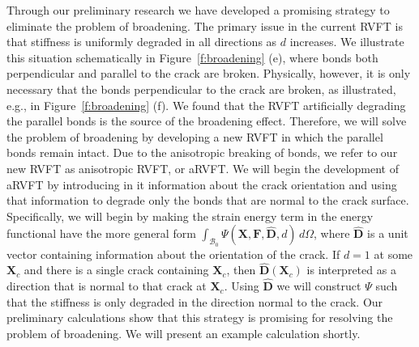\documentclass[10pt,letterpaper]{article}
\newcommand{\bs}[1]{\ensuremath{\boldsymbol{#1}}}
\begin{document}
    Through our preliminary research we have developed a promising strategy to eliminate the problem of broadening.
    The primary issue in the current RVFT is that stiffness is uniformly degraded in all directions as $d$ increases.
    We illustrate this situation schematically in Figure~\ref{f:broadening} (e), where bonds both perpendicular and parallel to the crack are broken.
    Physically, however,  it is only necessary that the bonds perpendicular to the crack are broken, as illustrated, e.g., in  Figure~\ref{f:broadening} (f).
    We found that the RVFT artificially degrading the parallel bonds is the source of the broadening effect.
    Therefore, we will solve the problem of broadening by developing a new RVFT in which the parallel bonds remain intact.
    Due to the anisotropic breaking of bonds, we refer to our new RVFT as anisotropic RVFT, or aRVFT.
    We will begin the development of aRVFT by introducing in it information about the crack orientation and using that information to degrade only the bonds that are normal to the crack surface.
    Specifically, we will begin by making the strain energy term in the energy functional have the more general form $\int_{\mathcal{B}_0}\mathsf{\Psi}(\bs{X}, \bs{F},\hat{\bs{D}},d)\, d\Omega$, where $\hat{\bs{D}}$ is a unit vector containing information about the orientation of the crack.
    If $d=1$ at some $\bs{X}_c$ and there is a single crack containing $\bs{X}_c$, then $\hat{\bs{D}}(\bs{X}_c)$ is interpreted as a direction that is normal to that crack at $\bs{X}_c$.
    Using $\hat{\bs{D}}$ we will construct $\mathsf{\Psi}$ such that the stiffness is only degraded in the direction normal to the crack.
    Our preliminary calculations show that this strategy is promising for resolving the problem of broadening.
    We will present an example calculation shortly.
\end{document}
